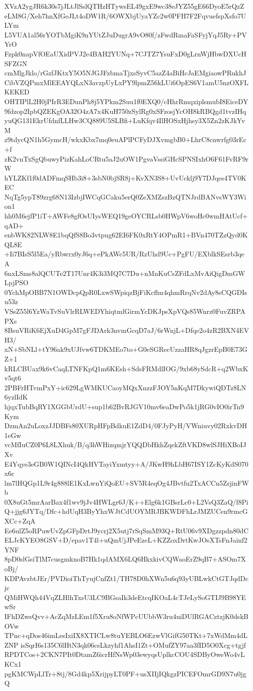 XVzA2ygJR6k30s7jJLtJlSslQTHzHTywsEL49gxE9wc38eJYZ55gE66DyoE5rQzZ
eLM8G/Xeh7hnXfGeJLt4oDW1R/6OWXbjUyaYZc2w0PFH7F2FqvuefspXsfo7ULYm
L5VUA1al56rYOTbMgiK9nYUtZJuDugrA9vO80f/zFwdRmaFaSFyjYqJ5Ry+PVYrO
Fzpk0napVfOEaUXidPVJ2e4BAH2YUNq+7CJTZ7YsuFxD0gLrnWjHbwDXUcHSFZGN
cmMlgJklo/rGzfJKtxY5O5NJGJFzbmaTjxsSyvC5azZ4aBiHcJaEMgiaowPRukhJ
CibVZQPmxMlEEAYQLxN3avzpUyLxPY9lpmZ56kLUi6OpES6V1amU5nzOXFLKEKED
OHTIPlL2H0jPIrR3EDunPh8j5YPkm2Suu1f0EXQ0/cHhrRmqxiplsmubI8EiceDY
9fdzop2IpbQZEKgOA32O4zA7x4KuH750zSylRg0xSFzosjYcOH8kRBQgd1tvzIHq
yuQG131EkrUfdnfLLHw3CQ889U5SLBfi+LuKfqv4IlHOSxHjhsy3X5Zn2zKJkYvM
z9tdycQN1h5GymcH/wkxKbx7mq0euAPlPCFyDJXvmgbB0+LhrC8cnwrfg03rEc+f
zK2vnTxSgQbuwyPizKahLoCRtu5aJ2uOW1PgvaVssiGHcSPNSIxhO6F61FvRF9rW
hYLZKf1f0dADFmqSHb3i8+3sbN0bjSR8j+KvXN3S8+UvUcklj9Y7DJqes4TV0KEC
NqTg5ypT89zrg68N13IzbjIWCqGCaku5erQ0ZeXMZszBzQTNJrdBANvsWY3Wion1
hh0M6ejfP1iT+AWFe8gfOsUIysWEQ19geOYCRLsb0HWpV6woHc0wmHAtUcf+qAD+
enbWK82NLW8E1bqQfS8Bo3vtpug62EI6FK0xRtY4OPmR1+BVn470TZzQyd0KQL8E
+Ii7BIsS5l5Ea/yRbwrx0yJ6q+ePkAWc5UR/RzUhd9Uc+PgFU/EXblkSEsrb3qeA
6nxLSms8alQCUTe2T17Unr4K3i3MQ7C7Du+nMnKuCsZFdLxMvAiQigDmGWLpjPSO
0YchMpOBB7N1OWDcpQpR0LxwSWpiqzBjFiKcflm4qhmRrqNv2dAy8sCQGDIsu53z
VSsZ55l6YzWaTvSuVlrRLWEDYhiqtmlGirmYcDKJpsXpVQs85Wnrz0FuvZRPAPXs
8BsuVRiK6EjXuD4GpM7gFJDArk3nvmGcqD7aJ/6rWnjL+Dfqe2o4zR2BXN4EVH3/
xN+SbNLl+tY96ak9xUJfvw6TDKMEo7to+G0eSGRecUzzaHR8qJgzrEpB0E73GZ+1
kRLCBUax9k6vCaqLTNFKpQ1m6KEsh+SdsFRMdlIOG/9xb68ySdcR+q2WbxKv5qt6
2PBFrHTvmPxY+ic629LgWMKUCaoyMQxXnzzFJOY5nKqM7DkywiQDTz8LN6yzlIdK
hjqxTubBqRY1XGGbUrdU+sup1b62BvRJGV10mv6eaDwPo5k1jRG0vIO0irTn9Kym
DzmAn2uLoxzJJDBFs80XURpHFpBdkuE1ZdD4/0FJyPyH/VWniuvy02RxkvDH1eGw
vcMfIuCZ0P6L8LXhuk/B/q3hWHizqmjrYQQDbHkhZqekZftVKD8wlSJHiXBoIJXv
E4Yqye3eGB0W1QINcI4QkHVTayiYxmtyy+A/JKwH9hLbH67ISY1ZcKyKdS070x6c
lm7lHQGp1L9r4g888lE1KxLwnYiQoEU+SV5R4eqOg4JBvtfu2TxACCn5ZrjinFWb
0X8uGt5mrAarBax4f1wv9jJv4HWLgr6J/K++Elg6k1GBsrLc0+L2VsQ3ZaQ/f8Pi
Q+jjg6JYTq/Dfc+hdUqH3ByYhxWJtCdUOYMRJBKWDFhLrJMZUCen9rmcGXCc+ZqA
Ee6ulZ5oRPuwUvZpGFpDrtJ9ycrj2X5utj7rSqSmM93Q+RtU06v9XDgzzpdn80dC
ELJcKYEO8GSV+D/epav1T4l+uQmUjJPeEzeL+KZZoxDrtKwJOsXTsFnJainf2YNF
8pD0slGsiTlM7cusgmknoB7Hk1qdAMX6LQ6HkxkivCQWaoErZ9qB7+ASOm7XoBj/
KDPAvzbtJEr/PVDioiThTyujCnfZt1/TH78D0hXWn5u6q93yUBLwkCtGTJqdDcjc
QMiHWQh44VqZLHlhTxsU3LC9BGsaIk3deEtcqIKOaL4cTJeLySoGTIJ9B98YEwSr
IFhDZwsQvv+AcZqMzLEm1f5Xru8oNfWPcUUbbW3ru4uiDUlRGACztzjK0dskBOVw
TPnc+qDos46imLesIxiIX8XTICLw8tuYEBLO6EzwVlGifG50TKt+7xWdMm4dLZNP
isSqrI6s135C6lHtN3qk06csLkzyhf1AhsI1Zt+OMufZY97aa3fID5O0Xcg+tgjf
RPDTCos+2CKN7PIt0DtamZ6icrHfNsWp03ewyqsUplkcCOU4SDByOweWo4vLKCx1
pgKMCWpLlTr+8tj/8Gd4kp5XrijpyLT0PF+usXIIjIQkgzPICEFOmrGD9N7u0jgQ
